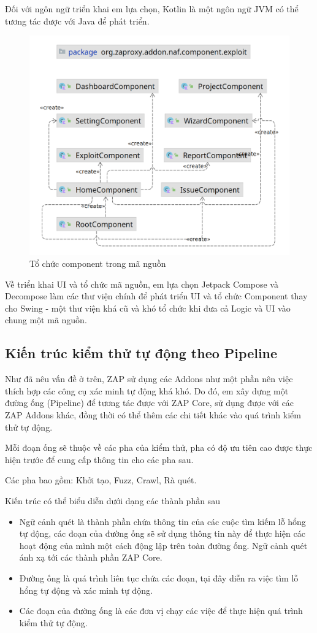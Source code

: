 \documentclass[./../main.tex]{subfiles}
\begin{document}
Đối với ngôn ngữ triển khai em lựa chọn, Kotlin là một ngôn ngữ JVM
có thể tương tác được với Java để phát triển.

\begin{figure}[H]
	\includegraphics[width=\linewidth]{./images/package.png}
	\caption{Tổ chức component trong mã nguồn}
	\label{fig:package}
\end{figure}

Về triển khai UI và tổ chức mã nguồn, em lựa chọn Jetpack Compose và
Decompose làm các thư viện chính để phát triển UI và tổ chức Component
thay cho Swing - một thư viện khá cũ và khó tổ chức khi đưa cả Logic
và UI vào chung một mã nguồn.

\subsection{Kiến trúc kiểm thử tự động theo Pipeline}
Như đã nêu vấn đề ở trên, ZAP sử dụng các Addons như một phần nên việc
thích hợp các công cụ xác minh tự động khá khó. Do đó, em xây dựng một
đường ống (Pipeline) để tương tác được với ZAP Core, sử dụng được với các
ZAP Addons khác, đồng thời có thể thêm các chi tiết khác vào quá trình kiểm thử tự động.

Mỗi đoạn ống sẽ thuộc về các pha của kiểm thử, pha có độ ưu tiên cao được
thực hiện trước để cung cấp thông tin cho các pha sau.

Các pha bao gồm: Khởi tạo, Fuzz, Crawl, Rà quét.

Kiến trúc có thể biểu diễn dưới dạng các thành phần sau
\begin{itemize}
	\item Ngữ cảnh quét là thành phần chứa thông tin của các cuộc
	      tìm kiếm lỗ hổng tự động, các đoạn của đường ống sẽ sử dụng thông tin này để thực hiện các hoạt động của mình một cách động lập trên toàn đường ống. Ngữ cảnh quét ánh xạ tới các thành phần ZAP Core.
	\item Đường ống là quá trình liên tục chứa các đoạn, tại đây diễn
	      ra việc tìm lỗ hổng tự động và xác minh tự động.
	\item Các đoạn của đường ống là các đơn vị chạy các việc để thực
	      hiện quá trình kiểm thử tự động.
\end{itemize}
\end{document}
